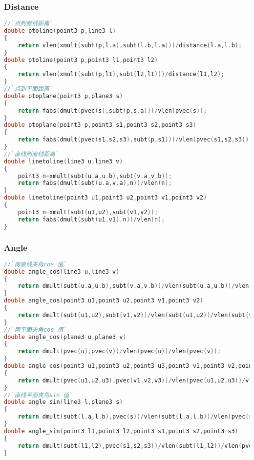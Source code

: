\subsubsection{Distance}
\begin{lstlisting}[language=C++]
//`点到直线距离`
double ptoline(point3 p,line3 l)
{
    return vlen(xmult(subt(p,l.a),subt(l.b,l.a)))/distance(l.a,l.b);
}
double ptoline(point3 p,point3 l1,point3 l2)
{
    return vlen(xmult(subt(p,l1),subt(l2,l1)))/distance(l1,l2);
}
//`点到平面距离`
double ptoplane(point3 p,plane3 s)
{
    return fabs(dmult(pvec(s),subt(p,s.a)))/vlen(pvec(s));
}
double ptoplane(point3 p,point3 s1,point3 s2,point3 s3)
{
    return fabs(dmult(pvec(s1,s2,s3),subt(p,s1)))/vlen(pvec(s1,s2,s3));
}
//`直线到直线距离`
double linetoline(line3 u,line3 v)
{
    point3 n=xmult(subt(u.a,u.b),subt(v.a,v.b));
    return fabs(dmult(subt(u.a,v.a),n))/vlen(n);
}
double linetoline(point3 u1,point3 u2,point3 v1,point3 v2)
{
    point3 n=xmult(subt(u1,u2),subt(v1,v2));
    return fabs(dmult(subt(u1,v1),n))/vlen(n);
}
\end{lstlisting}
\subsubsection{Angle}
\begin{lstlisting}[language=C++]
//`两直线夹角cos 值`
double angle_cos(line3 u,line3 v)
{
    return dmult(subt(u.a,u.b),subt(v.a,v.b))/vlen(subt(u.a,u.b))/vlen(subt(v.a,v.b));
}
double angle_cos(point3 u1,point3 u2,point3 v1,point3 v2)
{
    return dmult(subt(u1,u2),subt(v1,v2))/vlen(subt(u1,u2))/vlen(subt(v1,v2));
}
//`两平面夹角cos 值`
double angle_cos(plane3 u,plane3 v)
{
    return dmult(pvec(u),pvec(v))/vlen(pvec(u))/vlen(pvec(v));
}
double angle_cos(point3 u1,point3 u2,point3 u3,point3 v1,point3 v2,point3 v3)
{
    return dmult(pvec(u1,u2,u3),pvec(v1,v2,v3))/vlen(pvec(u1,u2,u3))/vlen(pvec(v1,v2,v3));
}
//`直线平面夹角sin 值`
double angle_sin(line3 l,plane3 s)
{
    return dmult(subt(l.a,l.b),pvec(s))/vlen(subt(l.a,l.b))/vlen(pvec(s));
}
double angle_sin(point3 l1,point3 l2,point3 s1,point3 s2,point3 s3)
{
    return dmult(subt(l1,l2),pvec(s1,s2,s3))/vlen(subt(l1,l2))/vlen(pvec(s1,s2,s3));
}
\end{lstlisting}
